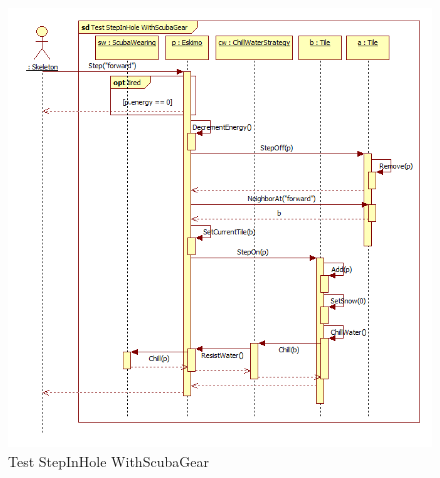 \begin{figure}[h]
	\begin{center}
		\includegraphics[width=17cm]{chapters/chapter05/diagrams/Test_StepInHole_WithScubaGear.png}
		\caption{Test StepInHole WithScubaGear}
		\label{fig:Test StepInHole WithScubaGear}
	\end{center}
\end{figure}

